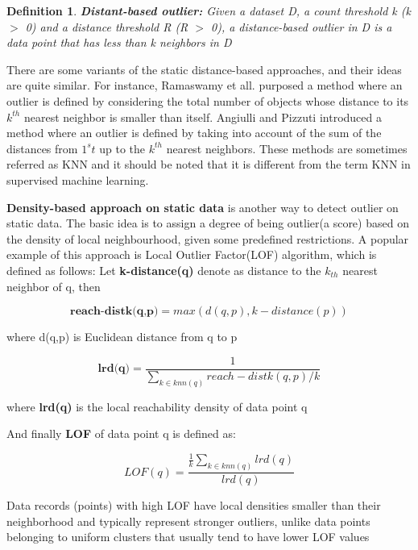 \documentclass[11pt]{article}       %
\newtheorem{definition}{Definition}
\begin{document}
\begin{definition}
\textbf{Distant-based outlier:} Given a dataset D, a count threshold k (k $>$ 0) and a distance threshold R (R $>$ 0), a distance-based outlier in D is a data point that has less than k neighbors in D
\end{definition}

There are some variants of the static distance-based approaches, and their ideas are quite similar. For instance, Ramaswamy et all.\cite{Ramaswamy:2000:EAM:342009.335437} purposed a method where an outlier is defined by considering the total number of objects whose distance to its $k^{th}$ nearest neighbor is smaller than itself. Angiulli and Pizzuti\cite{1377172} introduced a method where an outlier is defined by taking into account of the sum of the distances from $1^st$ up to the $k^{th}$ nearest neighbors. These methods are sometimes referred as KNN and it should be noted that it is different from the term KNN in supervised machine learning. 

\textbf{Density-based approach on static data} is another way to detect outlier on static data. The basic idea is to assign a degree of being outlier(a score) based on the density of local neighbourhood, given some predefined restrictions. A popular example of this approach is Local Outlier Factor(LOF) algorithm\cite{Breunig:2000:LID:342009.335388}, which is defined as follows: Let \textbf{k-distance(q)} denote as distance to the $k_{th}$ nearest neighbor of q, then

\begin{equation}
\textbf{reach-distk(q,p)} = max(d(q,p), k-distance(p))
\end{equation}

where d(q,p) is Euclidean distance from q to p  

\begin{equation}
\textbf{lrd(q)} =  \frac{1}{\sum\limits_{k \in knn(q)} reach-distk(q,p) / k}
\end{equation}

where \textbf{lrd(q)} is the local reachability density of data point q

And finally \textbf{LOF} of data point q is defined as:

\begin{equation}
 LOF(q) = \frac{\frac{1}{k} \sum_{k \in knn(q)} lrd(q)}{lrd(q)}
\end{equation}

Data records (points) with high LOF have local densities smaller than their neighborhood and typically represent stronger outliers, unlike data points belonging to uniform clusters that usually tend to have lower LOF values\cite{4221341}
\end{document}
